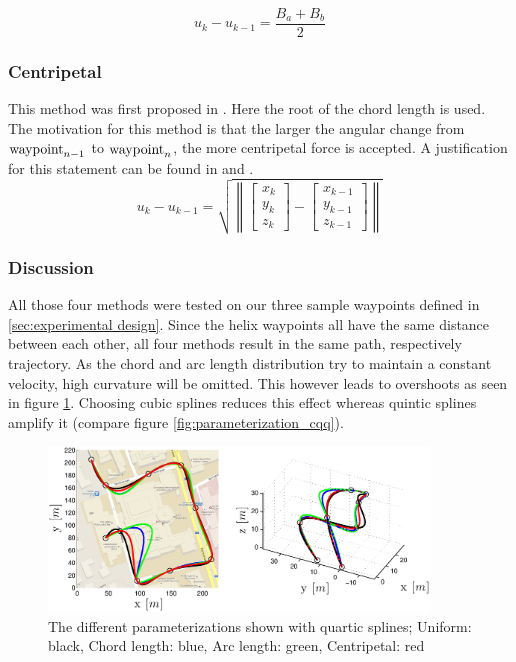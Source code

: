 \begin{equation*}
u_k-u_{k-1}=\frac{B_a+B_b}{2}
\end{equation*}

\subsubsection{Centripetal}
This method was first proposed in \cite{lee}. Here the root of the chord length is used. The motivation for this method is that the larger the angular change from $\textnormal{waypoint}_{n-1}$ to $\textnormal{waypoint}_n$, the more centripetal force is accepted. A justification for this statement can be found in \cite{doessegger} and \cite{lee}.
\begin{equation*}
u_k-u_{k-1}=\sqrt{\left \| \begin{bmatrix}x_k\\y_k\\z_k \end{bmatrix}-\begin{bmatrix}x_{k-1}\\y_{k-1}\\z_{k-1} \end{bmatrix}\right \|}
\end{equation*}

\subsubsection{Discussion}


All those four methods were tested on our three sample waypoints defined in \ref{sec:experimental design}. Since the helix waypoints all have the same distance between each other, all four methods result in the same path, respectively trajectory. As the chord and arc length distribution try to maintain a constant velocity, high curvature will be omitted. This however leads to overshoots as seen in figure \ref{fig:parameterizations4_road_agile}. Choosing cubic splines reduces this effect whereas quintic splines amplify it (compare figure \ref{fig:parameterization_cqq}).

\begin{figure}[H]
	\centering
    \includegraphics[width = 0.9\textwidth]{graphics/Parameterizations4_road_agile.eps}
  \caption{The different parameterizations shown with quartic splines; Uniform: black, Chord length: blue, Arc length: green, Centripetal: red}
  \label{fig:parameterizations4_road_agile}
\end{figure}

